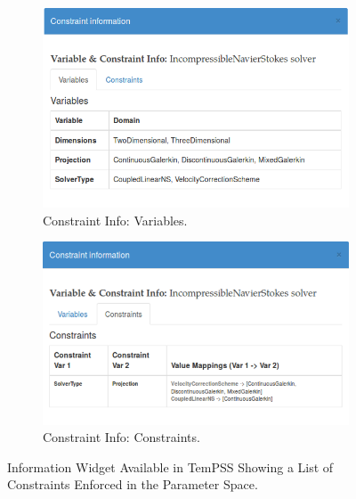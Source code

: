 \documentclass[11pt, a4paper]{report}
\begin{document}
\begin{figure}[htb!]
 \centering
 
 \label{fig:constraints_mapping}
\end{figure}

\begin{figure}[!htb]
\centering
\begin{subfigure}{.5\textwidth}
  \centering
  \includegraphics[width=.9\linewidth]{constraint_info}
  \caption{Constraint Info: Variables.}
  \label{fig:constraint_info}
\end{subfigure}%
\begin{subfigure}{.5\textwidth}
  \centering
  \includegraphics[width=.975\linewidth]{constraint_info_2}
  \caption{Constraint Info: Constraints.}
  \label{fig:constraint_info_2}
\end{subfigure}
\caption{Information Widget Available in TemPSS Showing a List of Constraints Enforced in the Parameter Space.}
\label{fig:constrain}
\end{figure}
\end{document}
